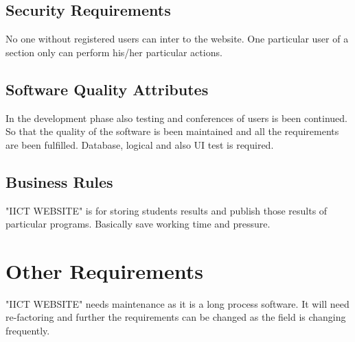 \documentclass{scrreprt}
\begin{document}
\section{Security Requirements}
No one without registered users can inter to the website. One particular user of a section only can perform his/her particular actions. 

\section{Software Quality Attributes}
In the development phase also testing and conferences of users is been continued. So that the quality of the software is been maintained and all the requirements are been fulfilled.
\newline
Database, logical and also UI test is required. 

\section{Business Rules}
"IICT WEBSITE" is for storing students results and publish those results of particular programs.
\newline
Basically save working time and pressure. 


\chapter{Other Requirements}
"IICT WEBSITE" needs maintenance as it is a long process software. It will need re-factoring and further the requirements can be changed as the field is changing frequently. 
\end{document}
